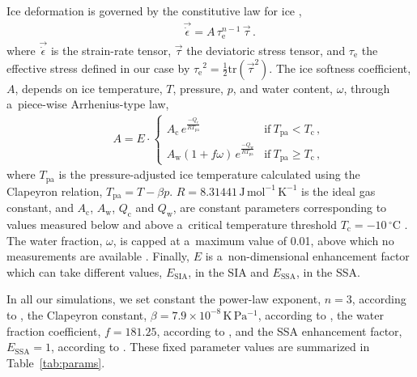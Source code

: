 \documentclass{article}
\newcommand{\unit}[1]{\ensuremath{\mathrm{#1}}}
\newcommand{\degree}[0]{\ensuremath{^{\circ}}}
\begin{document}
      Ice deformation is governed by the constitutive law for ice
      \citep{Glen.1952, Nye.1953},
%
\begin{align}
&\label{eqn:glenslaw}
&\vec{\dot{\epsilon}} = A\,\tau_{\mathrm{e}}^{n-1}\,\vec{\tau} \,.
\end{align}
%
      where $\vec{\dot{\epsilon}}$ is the strain-rate tensor,
      $\vec{\tau}$ the deviatoric stress tensor, and $\tau_{\mathrm{e}}$ the
      effective stress defined in our case by ${\tau_{\mathrm{e}}}^2 = \frac{1}{2}
      \mathrm{tr}(\vec{\tau}^2)$. The ice softness coefficient, $A$, depends
      on ice temperature, $T$, pressure, $p$, and water content, $\omega$,
      through a~piece-wise Arrhenius-type law,
%
\begin{align}
&\label{eqn:softness}
&A = E\cdot
\begin{cases}
A_{\mathrm{c}} \,e^\frac{-Q_{\mathrm{c}}}{RT_{\text{pa}}}            & \text{if}\ T_{\text{pa}}  <  T_{\mathrm{c}} \,, \\
A_{\mathrm{w}} (1+f\omega)\,e^\frac{-Q_{\mathrm{w}}}{RT_{\text{pa}}} & \text{if}\ T_{\text{pa}} \ge T_{\mathrm{c}} \,,
\end{cases}
\end{align}
%
      where $T_{\text{pa}}$ is the pressure-adjusted ice temperature
      calculated using the Clapeyron relation, ${T_{\text{pa}} = T - \beta
      p}$. $R=8.31441$\,\unit{J\,mol^{-1}\,K^{-1}} is the ideal gas
      constant, and $A_{\mathrm{c}}$, $A_{\mathrm{w}}$, $Q_{\mathrm{c}}$ and
      $Q_{\mathrm{w}}$, are constant parameters corresponding to values
      measured below and above a~critical temperature threshold
      $T_{\mathrm{c}}=-10$\,\unit{{\degree}C}
      \citep[p.~72]{Paterson.Budd.1982,Cuffey.Paterson.2010}. The water
      fraction, $\omega$, is capped at a~maximum value of 0.01, above which
      no measurements are available \citep[Eq.~5.7]{Lliboutry.Duval.1985,
      Greve.1997}. Finally, $E$ is a~non-dimensional enhancement factor
      which can take different values, $E_{\text{SIA}}$, in the SIA and
      $E_{\text{SSA}}$, in the SSA.

      In all our simulations, we set constant the power-law exponent, $n=3$,
      according to \citet[p.~55--57]{Cuffey.Paterson.2010}, the Clapeyron
      constant, $\beta=7.9\times 10^{-8}$\,\unit{K\,Pa^{-1}}, according to
      \citet{Luthi.etal.2002}, the water fraction coefficient, $f=181.25$,
      according to \citet{Lliboutry.Duval.1985}, and the SSA enhancement
      factor, $E_{\text{SSA}}=1$, according to
      \citet[p.~77]{Cuffey.Paterson.2010}. These fixed parameter values are
      summarized in Table~\ref{tab:params}.
\end{document}
